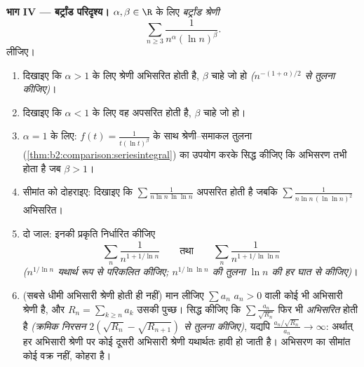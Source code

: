 \begin{problem}[{सप्ताहांत समस्या --- $\zeta(2) = \pi^2/6$ और बर्ट्रांड
परिदृश्य}]
\medskip
\noindent\textbf{भाग IV --- बर्ट्रांड परिदृश्य।} $\alpha,
\beta \in \R$ के लिए
\emph{बर्ट्रांड श्रेणी}
\[
\sum_{n \geq 3} \frac{1}{n^{\alpha}(\ln n)^{\beta}} .
\]
लीजिए।
\begin{enumerate}[resume]
  \item दिखाइए कि $\alpha > 1$ के लिए श्रेणी अभिसरित होती है, $\beta$ चाहे जो हो
        \emph{($n^{-(1+\alpha)/2}$ से तुलना कीजिए)}।
  \item दिखाइए कि $\alpha < 1$ के लिए वह अपसरित होती है, $\beta$ चाहे जो हो।
  \item $\alpha = 1$ के लिए: $f(t) =
        \frac{1}{t(\ln t)^\beta}$ के साथ श्रेणी--समाकल तुलना (\cref{thm:b2:comparison:seriesintegral}) का उपयोग करके
        सिद्ध कीजिए कि अभिसरण तभी होता है जब $\beta
        > 1$।
  \item सीमांत को दोहराइए: दिखाइए कि $\sum\frac{1}{n\ln n\,\ln\ln
        n}$ अपसरित होती है जबकि $\sum\frac{1}{n\ln n\,(\ln\ln n)^2}$
        अभिसरित।
  \item दो जाल: इनकी प्रकृति निर्धारित कीजिए
        \[
        \sum_n \frac{1}{n^{1 + 1/\ln n}}
        \qquad\text{तथा}\qquad
        \sum_n \frac{1}{n^{1 + 1/\ln\ln n}}
        \]
        \emph{($n^{1/\ln n}$ यथार्थ रूप से परिकलित कीजिए; $n^{1/\ln\ln n}$ की तुलना $\ln n$ की
        हर घात से कीजिए)}।
  \item (सबसे धीमी अभिसारी श्रेणी होती ही नहीं) मान लीजिए $\sum a_n$ $a_n > 0$
        वाली कोई भी अभिसारी श्रेणी है, और $R_n = \sum_{k
        \geq n}a_k$ उसकी पुच्छ। सिद्ध कीजिए
        कि $\sum
        \frac{a_n}{\sqrt{R_n}}$ फिर भी \emph{अभिसरित} होती है \emph{(क्रमिक निरसन $2(\sqrt{R_n} -
        \sqrt{R_{n+1}})$
        से तुलना कीजिए)}, यद्यपि $\frac{a_n/\sqrt{R_n}}{a_n}
        \to \infty$: अर्थात् हर अभिसारी श्रेणी पर कोई
        दूसरी अभिसारी श्रेणी यथार्थतः हावी हो जाती है। अभिसरण का सीमांत
        कोई वक्र नहीं, कोहरा है।
\end{enumerate}


\end{problem}
